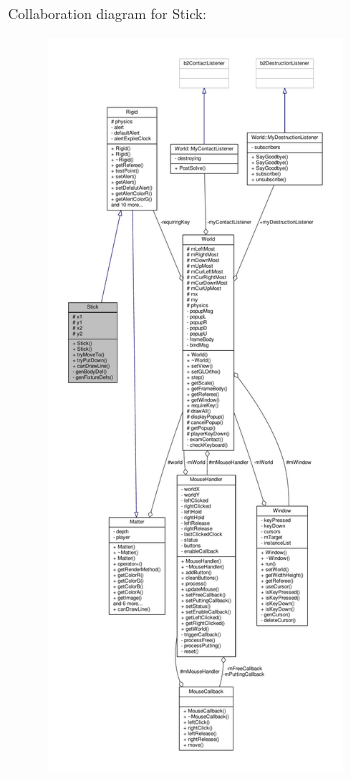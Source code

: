 Collaboration diagram for Stick\+:
\nopagebreak
\begin{figure}[H]
\begin{center}
\leavevmode
\includegraphics[height=550pt]{classStick__coll__graph}
\end{center}
\end{figure}
